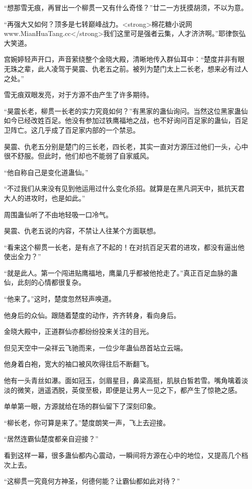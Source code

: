 \begin{this_body}
“想那雪无痕，再冒出一个柳贯一又有什么奇怪？”廿二一方抚摸胡须，不以为意。

“再强大又如何？顶多是七转巅峰战力。<strong>棉花糖小说网www.MianHuaTang.cc</strong>我们这里可是强者云集，人才济济啊。”耶律恢弘大笑道。

宫婉婷轻声开口，声音萦绕整个金晓大殿，清晰地传入群仙耳中：“楚度并非有眼无珠之辈，此人凌驾于昊震、仇老五之前。被列为楚门太上二长老，想来必有过人之处。”

雪无痕双眼发亮，对于方源不由产生了许多期待。

“昊震长老，柳贯一长老的实力究竟如何？”有黑家的蛊仙询问。当然这位黑家蛊仙如今已经改姓百足。他没有参加过铁鹰福地之战，也不好询问百足家的蛊仙，百足卫阵亡。这几乎成了百足家内部的一个禁忌。

昊震、仇老五分别是楚门的三长老，四长老，其实一直对方源压过他们一头，心中很不舒服。但此时，他们却也不能弱了自家威风。

“他自称自己是变化道蛊仙。”

“不过我们从来没有见到他运用过什么变化杀招。就算是在黑凡洞天中，抵抗天君大人的进攻时，也是如此。”

周围蛊仙听了不由地轻吸一口冷气。

昊震、仇老五说的内容，不禁让人往某个方面联想。

“看来这个柳贯一长老，是有点了不起的！在对抗百足天君的进攻，都没有逼出他使出全力？”

“就是此人。第一个闯进贴鹰福地，鹰巢几乎都被他抢走了。”真正百足血脉的蛊仙，此刻的心情都很复杂。

“他来了。”这时，楚度忽然轻声唤道。

他身后的众仙。跟随着楚度的动作，齐齐转身，看向身后。

金晓大殿中，正道群仙亦都纷纷投来关注的目光。

但见天空中一朵祥云飞驰而来，一位少年蛊仙昂首站立云端。

他身着白袍，宽大的袖口被风吹得往后不断翻飞。

他有一头青丝如瀑。面如冠玉，剑眉星目，鼻梁高挺，肌肤白皙若雪。嘴角噙着淡淡的微笑，逍遥洒脱，英俊至极，即便是让男人一见之下，都产生了惊艳之感。

单单第一眼，方源就给在场的群仙留下了深刻印象。

“柳长老，你可算是来了。”楚度朗笑一声，飞上去迎接。

“居然连霸仙楚度都亲自迎接？”

看到这样一幕，很多蛊仙都内心震动，一瞬间将方源在心中的地位，又提高几个档次上去。

“这柳贯一究竟何方神圣，何德何能？让霸仙都如此对待？”


\end{this_body}
